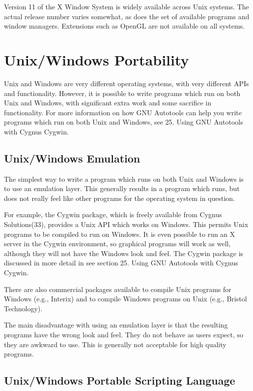 \begin{description}
Version 11 of the X Window System is widely available across Unix systems.
The actual release number varies somewhat, as does the set of available 
programs and window managers. Extensions such as OpenGL are not available 
on all systems. 
\end{description}

\section{Unix/Windows Portability}

Unix and Windows are very different operating systems, with very different APIs and functionality. However, it is possible to write programs which run on both Unix and Windows, with significant extra work and some sacrifice in functionality. For more information on how GNU Autotools can help you write programs which run on both Unix and Windows, see 25. Using GNU Autotools with Cygnus Cygwin. 

\subsection{Unix/Windows Emulation}

The simplest way to write a program which runs on both Unix and Windows is to use an emulation layer. This generally results in a program which runs, but does not really feel like other programs for the operating system in question.

For example, the Cygwin package, which is freely available from Cygnus Solutions(33), provides a Unix API which works on Windows. This permits Unix programs to be compiled to run on Windows. It is even possible to run an X server in the Cygwin environment, so graphical programs will work as well, although they will not have the Windows look and feel. The Cygwin package is discussed in more detail in see section 25. Using GNU Autotools with Cygnus Cygwin.

There are also commercial packages available to compile Unix programs for Windows (e.g., Interix) and to compile Windows programs on Unix (e.g., Bristol Technology).

The main disadvantage with using an emulation layer is that the resulting programs have the wrong look and feel. They do not behave as users expect, so they are awkward to use. This is generally not acceptable for high quality programs. 

\subsection{Unix/Windows Portable Scripting Language}

